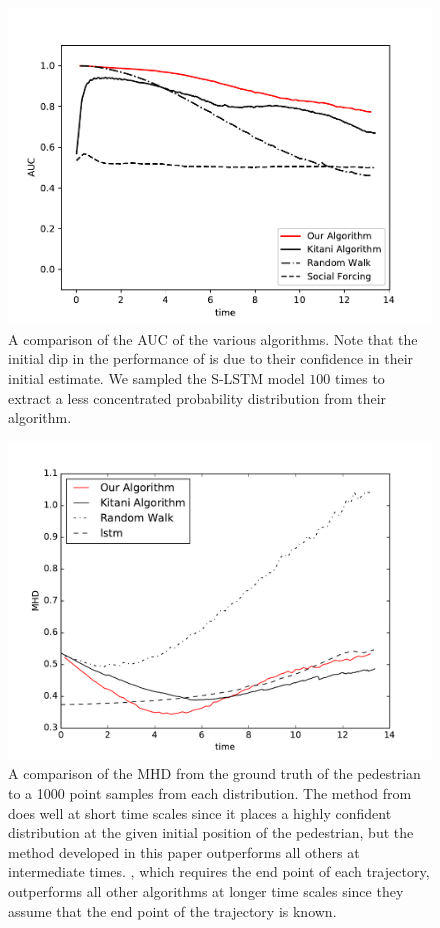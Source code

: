 \documentclass[letterpaper,10pt,conference]{ieeeconf}
\begin{document}
\begin{figure}
	\centering
	\includegraphics[width=0.9\linewidth]{./figures/the_results.pdf}
	\caption{A comparison of the AUC of the various algorithms. Note that the initial dip in the performance of \cite{Kitani2012} is due to their confidence in their initial estimate. We sampled the S-LSTM \cite{Alahi2016} model $100$ times to extract a less concentrated probability distribution from their algorithm.}
	\label{fig:auc_vs_time}
	\vspace*{-0.75cm}
\end{figure}

\begin{figure}
	\centering
	\includegraphics[width=0.9\linewidth]{./figures/mhd_results.pdf}
	\caption{A comparison of the MHD from the ground truth of the pedestrian to a 1000 point samples from each distribution. The method from \cite{Alahi2016} does well at short time scales since it places a highly confident distribution at the given initial position of the pedestrian, but the method developed in this paper outperforms all others at intermediate times. \cite{Kitani2012}, which requires the end point of each trajectory, outperforms all other algorithms at longer time scales since they assume that the end point of the trajectory is known.}
	\label{fig:mhd_vs_time}
	\vspace*{-0.7cm}
\end{figure}
\end{document}

